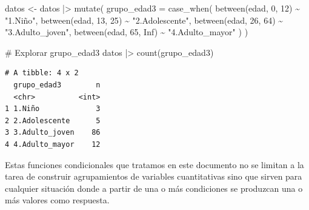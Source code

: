\documentclass[
  spanish,
  a4paper,
]{scrbook}
\newenvironment{Shaded}{\begin{snugshade}}{\end{snugshade}}
\newcommand{\AttributeTok}[1]{\textcolor[rgb]{0.40,0.45,0.13}{#1}}
\newcommand{\CommentTok}[1]{\textcolor[rgb]{0.37,0.37,0.37}{#1}}
\newcommand{\ConstantTok}[1]{\textcolor[rgb]{0.56,0.35,0.01}{#1}}
\newcommand{\DecValTok}[1]{\textcolor[rgb]{0.68,0.00,0.00}{#1}}
\newcommand{\FunctionTok}[1]{\textcolor[rgb]{0.28,0.35,0.67}{#1}}
\newcommand{\NormalTok}[1]{\textcolor[rgb]{0.00,0.23,0.31}{#1}}
\newcommand{\OtherTok}[1]{\textcolor[rgb]{0.00,0.23,0.31}{#1}}
\newcommand{\SpecialCharTok}[1]{\textcolor[rgb]{0.37,0.37,0.37}{#1}}
\newcommand{\StringTok}[1]{\textcolor[rgb]{0.13,0.47,0.30}{#1}}
\begin{document}
\begin{Shaded}
\begin{Highlighting}[]
\NormalTok{datos }\OtherTok{\textless{}{-}}\NormalTok{ datos }\SpecialCharTok{|\textgreater{}}
  \FunctionTok{mutate}\NormalTok{(}
    \AttributeTok{grupo\_edad3 =} \FunctionTok{case\_when}\NormalTok{(}
      \FunctionTok{between}\NormalTok{(edad, }\DecValTok{0}\NormalTok{, }\DecValTok{12}\NormalTok{) }\SpecialCharTok{\textasciitilde{}} \StringTok{"1.Niño"}\NormalTok{,}
      \FunctionTok{between}\NormalTok{(edad, }\DecValTok{13}\NormalTok{, }\DecValTok{25}\NormalTok{) }\SpecialCharTok{\textasciitilde{}} \StringTok{"2.Adolescente"}\NormalTok{,}
      \FunctionTok{between}\NormalTok{(edad, }\DecValTok{26}\NormalTok{, }\DecValTok{64}\NormalTok{) }\SpecialCharTok{\textasciitilde{}} \StringTok{"3.Adulto\_joven"}\NormalTok{,}
      \FunctionTok{between}\NormalTok{(edad, }\DecValTok{65}\NormalTok{, }\ConstantTok{Inf}\NormalTok{) }\SpecialCharTok{\textasciitilde{}} \StringTok{"4.Adulto\_mayor"}
\NormalTok{    )}
\NormalTok{  )}

\CommentTok{\# Explorar grupo\_edad3}
\NormalTok{datos }\SpecialCharTok{|\textgreater{}}
  \FunctionTok{count}\NormalTok{(grupo\_edad3)}
\end{Highlighting}
\end{Shaded}

\begin{verbatim}
# A tibble: 4 x 2
  grupo_edad3        n
  <chr>          <int>
1 1.Niño             3
2 2.Adolescente      5
3 3.Adulto_joven    86
4 4.Adulto_mayor    12
\end{verbatim}

\begin{tcolorbox}[enhanced jigsaw, arc=.35mm, bottomrule=.15mm, breakable, colback=white, colframe=quarto-callout-warning-color-frame, left=2mm, leftrule=.75mm, opacityback=0, rightrule=.15mm, toprule=.15mm]
\begin{minipage}[t]{5.5mm}
\textcolor{quarto-callout-warning-color}{\faExclamationTriangle}
\end{minipage}%
\begin{minipage}[t]{\textwidth - 5.5mm}

Estas funciones condicionales que tratamos en este documento no se
limitan a la tarea de construir agrupamientos de variables cuantitativas
sino que sirven para cualquier situación donde a partir de una o más
condiciones se produzcan una o más valores como respuesta.

\end{minipage}%
\end{tcolorbox}
\end{document}
